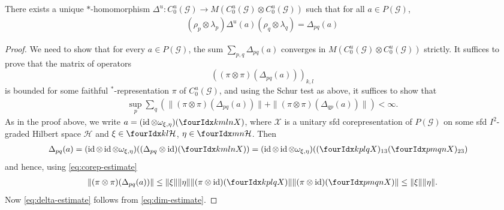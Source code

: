 \begin{Lem}
  There exists a unique $*$-homomorphism $\Delta^{u}\colon C^{u}_{0}(\mathscr{G})
  \to M(C^{u}_{0}(\mathscr{G}) \otimes C^{u}_{0}(\mathscr{G}))$ such that   for all $a \in P(\mathscr{G})$,
  \begin{align*}
    (\rho_{p} \otimes \lambda_{p})\Delta^{u}(a)(\rho_{q}\otimes \lambda_{q}) = \Delta_{pq}(a)
  \end{align*}
\end{Lem}
\begin{proof}
  We need to show that for every $a \in P(\mathscr{G})$, the sum
  $\sum_{p,q} \Delta_{pq}(a)$ converges in $M(C^{u}_{0}(\mathscr{G})
  \otimes C^{u}_{0}(\mathscr{G}))$ strictly.  It suffices to prove
  that the matrix of operators 
\[\left((\pi \otimes
    \pi)(\Delta_{pq}(a))\right)_{k,l}\] is bounded
 for some faithful $^*$-representation $\pi$ of
  $C^{u}_{0}(\mathscr{G})$, and using the Schur test as above, it
  suffices to show that
  \begin{align} \label{eq:delta-estimate}
    \sup_{p} \sum_{q} (\|(\pi \otimes \pi)(\Delta_{pq}(a))\| + \|(\pi \otimes \pi)(\Delta_{qp}(a))\|) < \infty.
  \end{align}
  As in the proof above, we write
  $a=(\id \otimes \omega_{\xi,\eta})(\Gr{X}{k}{l}{m}{n})$, where $\mathscr{X}$ is a unitary
  sfd corepresentation of $P(\mathscr{G})$ on some sfd $I^{2}$-graded
  Hilbert space $\mathcal{H}$ and
  $\xi\in \Gru{\mathcal{H}}{k}{l}$, $\eta\in \Gru{\mathcal{H}}{m}{n}$. Then
  \begin{align*}
    \Delta_{pq}(a) &= (\id \otimes \id \otimes \omega_{\xi,\eta})((\Delta_{pq} \otimes
    \id)(\Gr{X}{k}{l}{m}{n})) =
    (\id \otimes \id \otimes \omega_{\xi,\eta})((\Gr{X}{k}{l}{p}{q})_{13}(\Gr{X}{p}{q}{m}{n})_{23})
  \end{align*}
and hence, using \eqref{eq:corep-estimate}
\begin{align*}
  \|(\pi \otimes \pi)(\Delta_{pq}(a))\| \leq \|\xi\|\|\eta\| \|(\pi \otimes \id)(\Gr{X}{k}{l}{p}{q})\|
  \|(\pi \otimes \id)(\Gr{X}{p}{q}{m}{n})\|  \leq \|\xi\|\|\eta\|.
\end{align*}
Now \eqref{eq:delta-estimate} follows from \eqref{eq:dim-estimate}.
\end{proof}



